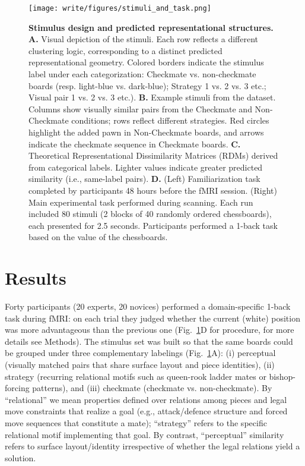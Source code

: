 \documentclass[preprint,12pt]{elsarticle}
\begin{document}
\begin{figure}[!htp]
  \centering
  \texttt{[image: write/figures/stimuli\_and\_task.png]}
  \caption{ 
  \textbf{Stimulus design and predicted representational structures.} 
  \textbf{A.} Visual depiction of the stimuli. Each row reflects a different clustering logic, corresponding to a distinct predicted representational geometry. Colored borders indicate the stimulus label under each categorization: Checkmate vs. non-checkmate boards (resp. light-blue vs. dark-blue); Strategy 1 vs. 2 vs. 3 etc.; Visual pair 1 vs. 2 vs. 3 etc.). 
  \textbf{B.} Example stimuli from the dataset. Columns show visually similar pairs from the Checkmate and Non-Checkmate conditions; rows reflect different strategies. Red circles highlight the added pawn in Non-Checkmate boards, and arrows indicate the checkmate sequence in Checkmate boards. 
  \textbf{C.} Theoretical Representational Dissimilarity Matrices (RDMs) derived from categorical labels. Lighter values indicate greater predicted similarity (i.e., same-label pairs).
  \textbf{D.} (Left) Familiarization task completed by participants 48 hours before the fMRI session. (Right) Main experimental task performed during scanning. Each run included 80 stimuli (2 blocks of 40 randomly ordered chessboards), each presented for 2.5 seconds. Participants performed a 1-back task based on the value of the chessboards.
  }
  \label{fig:stimuli_and_task}
\end{figure}

\section{Results} 

Forty participants (20 experts, 20 novices) performed a domain-specific 1-back task during fMRI: on each trial they judged whether the current (white) position was more advantageous than the previous one (Fig.~\ref{fig:stimuli_and_task}D for procedure, for more details see Methods). The stimulus set was built so that the same boards could be grouped under three complementary labelings (Fig.~\ref{fig:stimuli_and_task}A): (i) perceptual (visually matched pairs that share surface layout and piece identities), (ii) strategy (recurring relational motifs such as queen-rook ladder mates or bishop-forcing patterns), and (iii) checkmate (checkmate vs. non-checkmate). By “relational” we mean properties defined over relations among pieces and legal move constraints that realize a goal (e.g., attack/defence structure and forced move sequences that constitute a mate); “strategy” refers to the specific relational motif implementing that goal. By contrast, “perceptual” similarity refers to surface layout/identity irrespective of whether the legal relations yield a solution.
\end{document}
